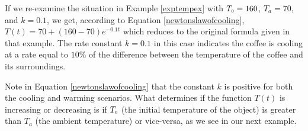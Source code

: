 \smallskip 

If we re-examine the situation in Example \ref{exptempex} with $T_{\mbox{\tiny$0$}} = 160$, $T_{a} = 70$, and $k = 0.1$, we get, according to Equation \ref{newtonslawofcooling}, $T(t) = 70 + (160 - 70)e^{-0.1t}$ which reduces to the original formula given in that example.  The rate constant $k = 0.1$ in this case indicates the coffee is cooling at a rate equal to $10 \%$ of the difference between the temperature of the coffee and its surroundings.  

\smallskip

Note in Equation \ref{newtonslawofcooling} that the constant $k$ is positive for both the cooling and warming scenarios.  What determines if the function $T(t)$ is increasing or decreasing is if $T_{\mbox{\tiny$0$}}$ (the initial temperature of the object) is greater than $T_{a}$ (the ambient temperature) or vice-versa, as we see in our next example.

\smallskip

